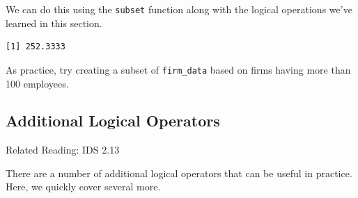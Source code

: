 \documentclass[
  letterpaper,
  DIV=11,
  numbers=noendperiod]{scrreprt}
\newenvironment{Shaded}{\begin{snugshade}}{\end{snugshade}}
\newcommand{\FunctionTok}[1]{\textcolor[rgb]{0.28,0.35,0.67}{#1}}
\newcommand{\NormalTok}[1]{\textcolor[rgb]{0.00,0.23,0.31}{#1}}
\newcommand{\OtherTok}[1]{\textcolor[rgb]{0.00,0.23,0.31}{#1}}
\newcommand{\SpecialCharTok}[1]{\textcolor[rgb]{0.37,0.37,0.37}{#1}}
\newcommand{\StringTok}[1]{\textcolor[rgb]{0.13,0.47,0.30}{#1}}
\begin{document}
We can do this using the \texttt{subset} function along with the logical
operations we've learned in this section.

\begin{Shaded}
\end{Shaded}

\begin{verbatim}
[1] 252.3333
\end{verbatim}

As practice, try creating a subset of \texttt{firm\_data} based on firms
having more than 100 employees.

\subsection{Additional Logical
Operators}\label{additional-logical-operators}

Related Reading: IDS 2.13

There are a number of additional logical operators that can be useful in
practice. Here, we quickly cover several more.
\end{document}
